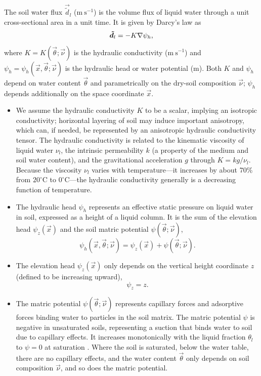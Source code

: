 \documentclass{report}
\begin{document}
The soil water flux $\vec{\tilde d}_l$ ($\mathrm{m~s^{-1}}$) is the volume flux of liquid water through a unit cross-sectional area in a unit time. It is given by Darcy's law as 
\begin{equation}\label{e:darcy_law}
    \boldsymbol{{\tilde d}}_l = - K \nabla \psi_h,
\end{equation}
where $K=K(\vec{\theta}; \vec{\nu})$ is the hydraulic conductivity ($\mathrm{m~s^{-1}}$) and $\psi_h = \psi_h(\vec{x}, \vec{\theta}; \vec{\nu})$ is the hydraulic head or water potential ($\mathrm{m}$). Both $K$ and $\psi_h$ depend on water content $\vec{\theta}$ and parametrically on the dry-soil composition $\vec{\nu}$; $\psi_h$ depends additionally on the space coordinate $\vec{x}$. 
\begin{itemize}
\item We assume the hydraulic conductivity $K$ to be a scalar, implying an isotropic conductivity; horizontal layering of soil may induce important anisotropy, which can, if needed, be represented by an anisotropic hydraulic conductivity tensor. The hydraulic conductivity is related to the kinematic viscosity of liquid water $\nu_l$, the intrinsic permeability $k$ (a property of the medium and soil water content), and the gravitational acceleration $g$ through $K=kg/\nu_l$. Because the viscosity $\nu_l$ varies with temperature---it increases by about 70\% from $20^\circ\mathrm{C}$ to $0^\circ\mathrm{C}$---the hydraulic conductivity generally is a decreasing function of temperature. 
\item The hydraulic head $\psi_h$ represents an effective static pressure on liquid water in soil, expressed as a height of a liquid column. It is the sum of the elevation head $\psi_z(\vec{x})$ and the soil matric potential $\psi(\vec{\theta}; \vec{\nu})$,
\begin{equation}\label{e:hydr_head}
    \psi_h(\vec{x}, \vec{\theta}; \vec{\nu})  = \psi_z(\vec{x}) + \psi(\vec{\theta}; \vec{\nu}).
\end{equation}
\item The elevation head $\psi_z(\vec{x})$ only depends on the vertical height coordinate $z$ (defined to be increasing upward), 
\begin{equation}
\psi_z = z.
\end{equation}
\item The matric potential $\psi(\vec{\theta}; \vec{\nu})$ represents capillary forces and adsorptive forces binding water to particles in the soil matrix. The matric potential $\psi$ is negative in unsaturated soils, representing a suction that binds water to soil due to capillary effects. It increases monotonically with the liquid fraction $\theta_l$ to $\psi = 0$ at saturation \citep{Bonan19a}. Where the soil is saturated, below the water table,  there are no capillary effects, and the water content $\vec{\theta}$ only depends on soil composition $\vec{\nu}$, and so does the matric potential.
\end{itemize}
\end{document}
